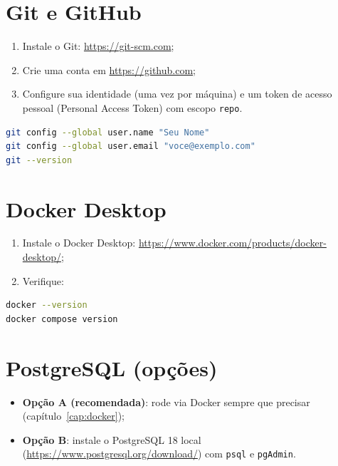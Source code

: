 \section{Git e GitHub}

\begin{enumerate}[leftmargin=*, itemsep=0.3em]
  \item Instale o Git: \url{https://git-scm.com};
  \item Crie uma conta em \url{https://github.com};
  \item Configure sua identidade (uma vez por máquina) e um token de acesso
  pessoal (Personal Access Token) com escopo \texttt{repo}.
\end{enumerate}

\begin{lstlisting}[style=livro, language=Bash, caption={Configuração inicial do Git.}, label={list:inst-git}]
git config --global user.name "Seu Nome"
git config --global user.email "voce@exemplo.com"
git --version
\end{lstlisting}

\section{Docker Desktop}

\begin{enumerate}[leftmargin=*, itemsep=0.3em]
  \item Instale o Docker Desktop: \url{https://www.docker.com/products/docker-desktop/};
  \item Verifique:
\end{enumerate}

\begin{lstlisting}[style=livro, language=Bash, caption={Verificação do Docker.}, label={list:inst-docker}]
docker --version
docker compose version
\end{lstlisting}

\section{PostgreSQL (opções)}

\begin{itemize}[leftmargin=*, itemsep=0.3em]
  \item \textbf{Opção A (recomendada)}: rode via Docker sempre que precisar
  (capítulo~\ref{cap:docker}); 
  \item \textbf{Opção B}: instale o PostgreSQL 18 local
  (\url{https://www.postgresql.org/download/}) com \texttt{psql} e \texttt{pgAdmin}.
\end{itemize}

